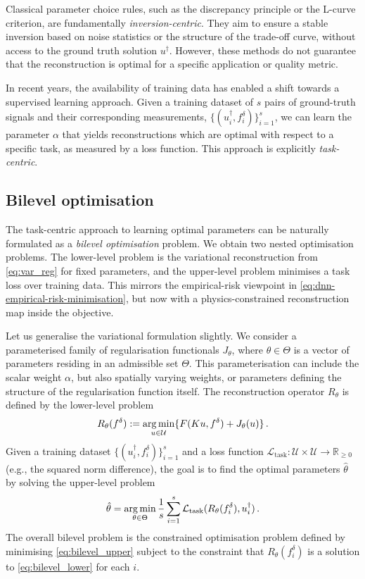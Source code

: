 Classical parameter choice rules, such as the discrepancy principle or the L-curve criterion, are fundamentally \emph{inversion-centric}. They aim to ensure a stable inversion based on noise statistics or the structure of the trade-off curve, without access to the ground truth solution $u^\dagger$. However, these methods do not guarantee that the reconstruction is optimal for a specific application or quality metric.

In recent years, the availability of training data has enabled a shift towards a supervised learning approach. Given a training dataset of $s$ pairs of ground-truth signals and their corresponding measurements, $\{(u_i^\dagger, f_i^\delta)\}_{i=1}^s$, we can learn the parameter $\alpha$ that yields reconstructions which are optimal with respect to a specific task, as measured by a loss function. This approach is explicitly \emph{task-centric}.

\subsection{Bilevel optimisation}\label{sec:bilevel}
The task-centric approach to learning optimal parameters can be naturally formulated as a \emph{bilevel optimisation} problem. We obtain two nested optimisation problems. The lower-level problem is the variational reconstruction from \eqref{eq:var_reg} for fixed parameters, and the upper-level problem minimises a task loss over training data. This mirrors the empirical-risk viewpoint in \eqref{eq:dnn-empirical-risk-minimisation}, but now with a physics-constrained reconstruction map inside the objective.

Let us generalise the variational formulation slightly. We consider a parameterised family of regularisation functionals $J_\theta$, where $\theta \in \Theta$ is a vector of parameters residing in an admissible set $\Theta$. This parameterisation can include the scalar weight $\alpha$, but also spatially varying weights, or parameters defining the structure of the regularisation function itself. The reconstruction operator $R_\theta$ is defined by the lower-level problem
\begin{align}
    R_\theta(f^\delta) := \operatorname*{arg\,min}_{u \in \mathcal{U}} \{ F(K u, f^\delta) + J_\theta(u) \} \, . \label{eq:bilevel_lower}
\end{align}
Given a training dataset $\{(u_i^\dagger, f_i^\delta)\}_{i=1}^s$ and a loss function $\mathcal{L}_{\text{task}} \colon \mathcal{U} \times \mathcal{U} \to \mathbb{R}_{\geq 0}$ (e.g., the squared norm difference), the goal is to find the optimal parameters $\hat{\theta}$ by solving the upper-level problem
\begin{align}
    \hat{\theta} = \operatorname*{arg\,min}_{\theta \in \Theta} \frac{1}{s} \sum_{i=1}^s \mathcal{L}_{\text{task}}(R_\theta(f_i^\delta), u_i^\dagger) \, . \label{eq:bilevel_upper}
\end{align}
The overall bilevel problem is the constrained optimisation problem defined by minimising \eqref{eq:bilevel_upper} subject to the constraint that $R_\theta(f_i^\delta)$ is a solution to \eqref{eq:bilevel_lower} for each $i$.

